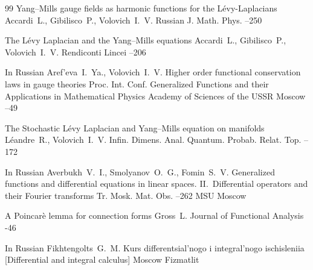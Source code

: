 \begin{thebibliography}{99}
\paper Yang--Mills gauge fields as harmonic  functions for the L\'evy-Laplacians
\by Accardi~L., Gibilisco~P., Volovich~I.~V.
\jour  Russian J. Math. Phys.
--250





\paper  The L\'evy Laplacian and the Yang--Mills equations
\by Accardi~L., Gibilisco~P., Volovich~I.~V.
\jour Rendiconti Lincei
--206



\lang In Russian
\by Aref'eva~I.~Ya., Volovich~I.~V.
\paper Higher order functional conservation laws in gauge theories
\inbook Proc. Int. Conf. Generalized Functions and their Applications in Mathematical Physics
\publ Academy of Sciences of the  USSR
\publaddr Moscow
--49


\paper The Stochastic L\'evy Laplacian and Yang--Mills equation on manifolds
\by L\'eandre~R., Volovich~I.~V.
\jour Infin. Dimens. Anal. Quantum. Probab. Relat. Top. 
--172




\lang In Russian
\by Averbukh~V.~I., Smolyanov~O.~G., Fomin~S.~V.
\paper Generalized functions and differential equations in linear spaces. II.~Differential operators and their Fourier transforms
\serial Tr. Mosk. Mat. Obs.
--262
\publ MSU
\publaddr Moscow




\paper  A Poincar\`{e} lemma for connection forms
\by Gross~L.
\jour Journal of Functional Analysis
-46


\lang In Russian
\by  Fikhtengolts~G.~M. 
\book Kurs differentsial'nogo i integral'nogo ischisleniia \rm [Differential and integral calculus]
\publaddr Moscow
\publ Fizmatlit 


\end{thebibliography}

\EngDate

\Russian
\newpage

%

